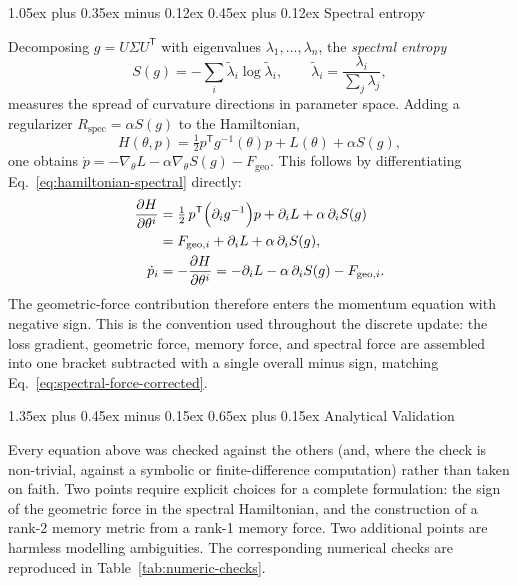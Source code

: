 \documentclass[10pt,twocolumn]{article}
\makeatletter
\renewcommand\section{\@startsection{section}{1}{0pt}%
  {1.35ex plus 0.45ex minus 0.15ex}%
  {0.65ex plus 0.15ex}%
  {\large\bfseries}}
\renewcommand\subsection{\@startsection{subsection}{2}{0pt}%
  {1.05ex plus 0.35ex minus 0.12ex}%
  {0.45ex plus 0.12ex}%
  {\normalsize\bfseries}}
\makeatother
\begin{document}
\subsection{Spectral entropy}
\label{sec:spectral-entropy}

Decomposing $g = U\Sigma U^{\mathsf T}$ with eigenvalues
$\lambda_1,\dots,\lambda_n$, the \emph{spectral entropy}
\begin{equation}
S(g) = -\sum_i \tilde\lambda_i \log \tilde\lambda_i, \qquad
\tilde\lambda_i = \frac{\lambda_i}{\sum_j \lambda_j},
\label{eq:spectral-entropy}
\end{equation}
measures the spread of curvature directions in parameter space. Adding a
regularizer $R_{\mathrm{spec}} = \alpha S(g)$ to the Hamiltonian,
\begin{equation}
H(\theta,p) = \tfrac12 p^{\mathsf T} g^{-1}(\theta) p + L(\theta) + \alpha S(g),
\label{eq:hamiltonian-spectral}
\end{equation}
one obtains
$\dot p = -\nabla_\theta L - \alpha \nabla_\theta S(g) - F_{\mathrm{geo}}$.
This follows by differentiating Eq.~\eqref{eq:hamiltonian-spectral} directly:
\begin{align}
\frac{\partial H}{\partial\theta^i}
  &= \tfrac12\, p^{\mathsf T}\Big(\partial_i g^{-1}\Big) p
     + \partial_i L + \alpha\, \partial_i S(g) \notag\\
  &= F_{\mathrm{geo},i} + \partial_i L + \alpha\,\partial_i S(g),
\label{eq:spectral-force-derivation}\\
\dot p_i &= -\frac{\partial H}{\partial \theta^i}
  = -\partial_i L - \alpha\, \partial_i S(g) - F_{\mathrm{geo},i}.
  \label{eq:spectral-force-corrected}
\end{align}
The geometric-force contribution therefore enters the momentum equation with
negative sign. This is the convention used throughout the discrete update:
the loss gradient, geometric force, memory force, and spectral force are
assembled into one bracket subtracted with a single overall minus sign,
matching Eq.~\eqref{eq:spectral-force-corrected}.

\section{Analytical Validation}
\label{sec:review}

Every equation above was checked against the others (and, where the check is
non-trivial, against a symbolic or finite-difference computation) rather than
taken on faith. Two points require explicit choices for a complete
formulation: the sign of the geometric force in the spectral Hamiltonian,
and the construction of a rank-2 memory metric from a rank-1 memory force.
Two additional points are harmless modelling ambiguities. The corresponding
numerical checks are reproduced in Table~\ref{tab:numeric-checks}.
\end{document}

